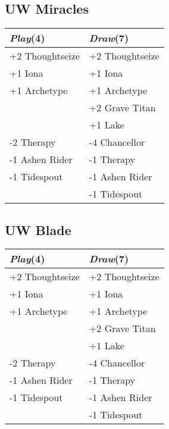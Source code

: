 \documentclass{article}
\renewcommand *\contentsname{Contents}
\begin{document}
\begin{multicols}{2}
\subsection*{UW Miracles}
\begin{center}
\begin{tabular}{| l | l |}
\hline
\textit{Play}(4) & \textit{Draw}(7) \\
\hline
\cellcolor[HTML]{BBDDBB}\small{+2 Thoughtseize} & \cellcolor[HTML]{BBDDBB}\small{+2 Thoughtseize}\\
\cellcolor[HTML]{BBDDBB}\small{+1 Iona} & \cellcolor[HTML]{BBDDBB}\small{+1 Iona}\\
\cellcolor[HTML]{BBDDBB}\small{+1 Archetype} & \cellcolor[HTML]{BBDDBB}\small{+1 Archetype}\\
 & \cellcolor[HTML]{BBDDBB}\small{+2 Grave Titan}\\
 & \cellcolor[HTML]{BBDDBB}\small{+1 Lake}\\
\cellcolor[HTML]{DDBBBB}\small{-2 Therapy} & \cellcolor[HTML]{DDBBBB}\small{-4 Chancellor}\\
\cellcolor[HTML]{DDBBBB}\small{-1 Ashen Rider} & \cellcolor[HTML]{DDBBBB}\small{-1 Therapy}\\
\cellcolor[HTML]{DDBBBB}\small{-1 Tidespout} & \cellcolor[HTML]{DDBBBB}\small{-1 Ashen Rider}\\
 & \cellcolor[HTML]{DDBBBB}\small{-1 Tidespout}\\
\hline
\end{tabular}
\end{center}
\subsection*{UW Blade}
\begin{center}
\begin{tabular}{| l | l |}
\hline
\textit{Play}(4) & \textit{Draw}(7) \\
\hline
\cellcolor[HTML]{BBDDBB}\small{+2 Thoughtseize} & \cellcolor[HTML]{BBDDBB}\small{+2 Thoughtseize}\\
\cellcolor[HTML]{BBDDBB}\small{+1 Iona} & \cellcolor[HTML]{BBDDBB}\small{+1 Iona}\\
\cellcolor[HTML]{BBDDBB}\small{+1 Archetype} & \cellcolor[HTML]{BBDDBB}\small{+1 Archetype}\\
 & \cellcolor[HTML]{BBDDBB}\small{+2 Grave Titan}\\
 & \cellcolor[HTML]{BBDDBB}\small{+1 Lake}\\
\cellcolor[HTML]{DDBBBB}\small{-2 Therapy} & \cellcolor[HTML]{DDBBBB}\small{-4 Chancellor}\\
\cellcolor[HTML]{DDBBBB}\small{-1 Ashen Rider} & \cellcolor[HTML]{DDBBBB}\small{-1 Therapy}\\
\cellcolor[HTML]{DDBBBB}\small{-1 Tidespout} & \cellcolor[HTML]{DDBBBB}\small{-1 Ashen Rider}\\
 & \cellcolor[HTML]{DDBBBB}\small{-1 Tidespout}\\
\hline
\end{tabular}
\end{center}

\end{multicols}
\end{document}

